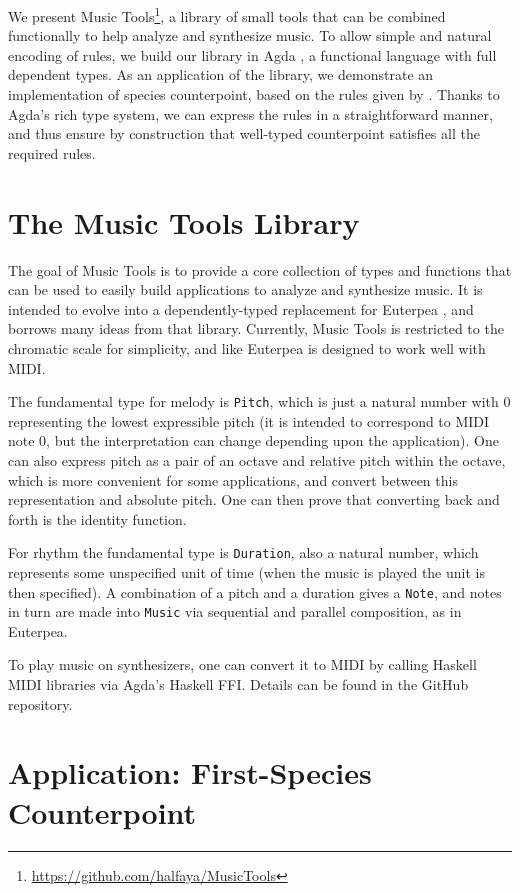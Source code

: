 \documentclass[sigplan,10pt,screen]{acmart}
\begin{document}
We present Music Tools\footnote{\url{https://github.com/halfaya/MusicTools}},
a library of small tools that can be combined functionally to 
help analyze and synthesize music.
To allow simple and natural encoding of rules, we build our 
library in Agda \citep{norellphd}, a functional language with full dependent types.
As an application of the library, we demonstrate an
implementation of species counterpoint, based on the rules 
given by \citet{fux1965study}.
Thanks to Agda's rich type system, we can express 
the rules in a straightforward manner, and thus ensure by 
construction that well-typed counterpoint satisfies all the 
required rules.


\section{The Music Tools Library}

The goal of Music Tools is to provide a core collection of types and functions
that can be used to easily build applications to analyze and synthesize music.
It is intended to evolve into a dependently-typed replacement for Euterpea
\citep{hudak2018haskell}, and borrows many ideas from that library.
Currently, Music Tools is restricted to the chromatic scale for simplicity, 
and like Euterpea is designed to work well with MIDI.

The fundamental type for melody is \texttt{Pitch}, which is just a natural number with $0$
representing the lowest expressible pitch (it is intended to correspond to MIDI note 0, but
the interpretation can change depending upon the application). One can also
express pitch as a pair of an octave and relative pitch within the octave, which is
more convenient for some applications, and convert between this representation and
absolute pitch. One can then prove that converting back and forth is the identity function.

For rhythm the fundamental type is \texttt{Duration}, also a natural number, which represents
some unspecified unit of time (when the music is played the unit is then specified).
A combination of a pitch and a duration gives a \texttt{Note}, and notes in turn are
made into \texttt{Music} via sequential and parallel composition, as in Euterpea.

To play music on synthesizers, one can convert it to MIDI by calling 
Haskell MIDI libraries via Agda's Haskell FFI. 
Details can be found in the GitHub repository.

\section{Application: First-Species Counterpoint}
\end{document}
